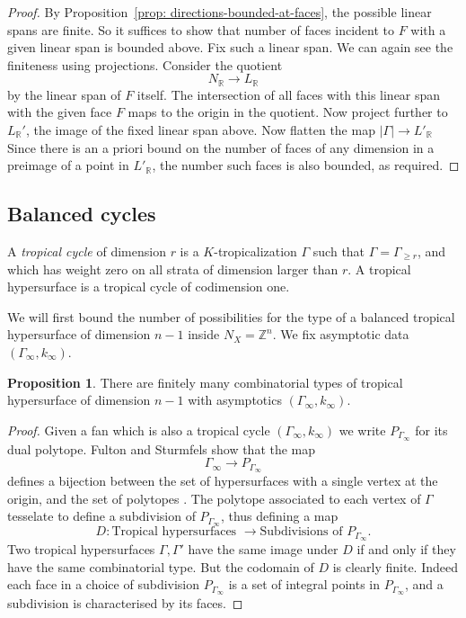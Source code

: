 \documentclass[11pt]{amsart}
\theoremstyle{definition}
\theoremstyle{definition}
\newtheorem{proposition}[theorem]{Proposition}
\begin{document}
\begin{proof}
By Proposition~\ref{prop: directions-bounded-at-faces}, the possible linear spans are finite. So it suffices to show that number of faces incident to $F$ with a given linear span is bounded above. Fix such a linear span. We can again see the finiteness using projections. Consider the quotient
\[
N_{\mathbb R}\to L_{\mathbb R}
\]
by the linear span of $F$ itself. The intersection of all faces with this linear span with the given face $F$ maps to the origin in the quotient. Now project further to $L_{\mathbb R}'$, the image of the fixed linear span above. Now flatten the map $|\Gamma|\to L'_{\mathbb R}$ Since there is an a priori bound on the number of faces of any dimension in a preimage of a point in $L'_{\mathbb R}$, the number such faces is also bounded, as required. 
\end{proof}

\subsection{Balanced cycles} 
A \textit{tropical cycle} of dimension $r$ is a $K$-tropicalization $\Gamma$ such that $\Gamma = \Gamma_{\geq r}$, and which has weight zero on all strata of dimension larger than $r$. A tropical hypersurface is a tropical cycle of codimension one.

We will first bound the number of possibilities for the type of a balanced tropical hypersurface of dimension $n-1$ inside $N_X = \mathbb{Z}^n$. We fix asymptotic data $(\Gamma_\infty,k_\infty)$.

\begin{proposition}\label{prop:bddTropHyp}
    There are finitely many combinatorial types of tropical hypersurface of dimension $n-1$ with asymptotics $(\Gamma_\infty,k_\infty)$.
\end{proposition}
\begin{proof}
    Given a fan which is also a tropical cycle $(\Gamma_\infty,k_\infty)$ we write $P_{\Gamma_\infty}$ for its dual polytope. Fulton and Sturmfels show that the map $$\Gamma_\infty \rightarrow P_{\Gamma_\infty}$$ defines a bijection between the set of hypersurfaces with a single vertex at the origin, and the set of polytopes \cite[Theorem 4.2]{IntToricVar}. 
    The polytope associated to each vertex of $\Gamma$ tesselate to define a subdivision of $P_{\Gamma_\infty}$, thus defining a map $$D\colon \text{Tropical hypersurfaces } \rightarrow \text{Subdivisions of } P_{\Gamma_\infty}.$$
    Two tropical hypersurfaces $\Gamma,\Gamma'$ have the same image under $D$ if and only if they have the same combinatorial type.
    But the codomain of $D$ is clearly finite. Indeed each face in a choice of subdivision $P_{\Gamma_\infty}$ is a set of integral points in $P_{\Gamma_\infty}$, and a subdivision is characterised by its faces.
\end{proof}
\end{document}
